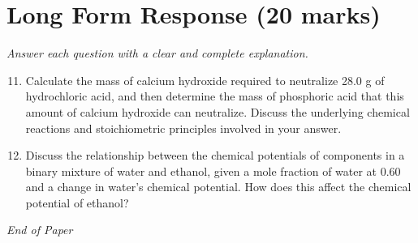 \documentclass[12pt]{article}
\begin{document}
\section*{Long Form Response (20 marks)}
\textit{Answer each question with a clear and complete explanation.}
\begin{enumerate}[label=\arabic*.]
\setcounter{enumi}{10}
\item Calculate the mass of calcium hydroxide required to neutralize 28.0 g of hydrochloric acid, and then determine the mass of phosphoric acid that this amount of calcium hydroxide can neutralize. Discuss the underlying chemical reactions and stoichiometric principles involved in your answer.
\item Discuss the relationship between the chemical potentials of components in a binary mixture of water and ethanol, given a mole fraction of water at 0.60 and a change in water's chemical potential. How does this affect the chemical potential of ethanol?
\end{enumerate}

\vfill
\noindent\textit{End of Paper}
\end{document}
